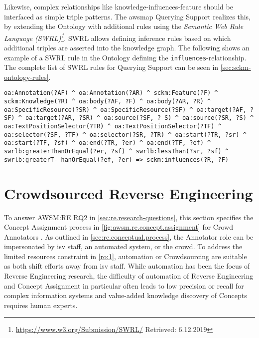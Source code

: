 Likewise, complex relationships like knowledge-influences-feature should be interfaced as simple triple patterns.
The \gls{awsmap} Querying Support realizes this, by extending the Ontology with additional rules using the \emph{Semantic Web Rule Language (SWRL)\footnote{\url{https://www.w3.org/Submission/SWRL/} Retrieved: 6.12.2019}}.
SWRL allows defining inference rules based on which additional triples are asserted into the knowledge graph.
The following shows an example of a SWRL rule in the Ontology defining the \texttt{influences}-relationship.
The complete list of SWRL rules for Querying Support can be seen in \cref{sec:sckm-ontology-rules}.

\begin{lstlisting}[language=sparql, captionpos=t, caption=SWRL Rules for sckm:influences, label=lst:swrl]
oa:Annotation(?AF) ^ oa:Annotation(?AR) ^ sckm:Feature(?F) ^ sckm:Knowledge(?R) ^ oa:body(?AF, ?F) ^ oa:body(?AR, ?R) ^ oa:SpecificResource(?SR) ^ oa:SpecificResource(?SF) ^ oa:target(?AF, ?SF) ^ oa:target(?AR, ?SR) ^ oa:source(?SF, ? S) ^ oa:source(?SR, ?S) ^ oa:TextPositionSelector(?TR) ^ oa:TextPositionSelector(?TF) ^ oa:selector(?SF, ?TF) ^ oa:selector(?SR, ?TR) ^ oa:start(?TR, ?sr) ^ oa:start(?TF, ?sf) ^ oa:end(?TR, ?er) ^ oa:end(?TF, ?ef) ^ swrlb:greaterThanOrEqual(?er, ?sf) ^ swrlb:lessThan(?sr, ?sf) ^ swrlb:greaterT- hanOrEqual(?ef, ?er) => sckm:influences(?R, ?F)
\end{lstlisting}

\vspace{-10pt}
\hypertarget{sec:csre}{%
\section{Crowdsourced Reverse Engineering}\label{sec:csre}}
\vspace{10pt}

To answer AWSM:RE RQ2 in \cref{sec:re.research-questions}, this section specifies the \gls{Concept Assignment} process in \cref{fig:awsm.re.concept.assignment} for Crowd Annotators \autocite{Heil2018CSRE,Heil2019CSRECCIS}.
As outlined in \cref{sec:re.conceptual.process}, the Annotator role can be impersonated by \gls{isv} staff, an automated system, or the crowd.
To address the limited resources constraint in \cref{ro:1}, automation or \gls{Crowdsourcing} are suitable as both shift efforts away from \gls{isv} staff.
While automation has been the focus of \gls{Reverse Engineering} research, the difficulty of automation of \gls{Reverse Engineering} and \gls{Concept Assignment} in particular often leads to low precision or recall \autocite{Canfora2007ReverseEngineering} for complex information systems and value-added knowledge discovery of \glspl{Concept} requires human experts.

